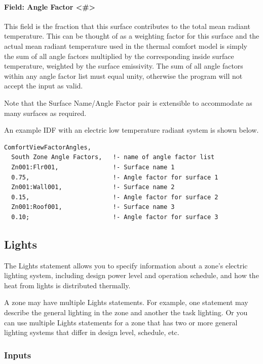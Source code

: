 \paragraph{Field: Angle Factor \textless{}\#\textgreater{}}\label{field-angle-factor}

This field is the fraction that this surface contributes to the total mean radiant temperature. This can be thought of as a weighting factor for this surface and the actual mean radiant temperature used in the thermal comfort model is simply the sum of all angle factors multiplied by the corresponding inside surface temperature, weighted by the surface emissivity. The sum of all angle factors within any angle factor list must equal unity, otherwise the program will not accept the input as valid.

Note that the Surface Name/Angle Factor pair is extensible to accommodate as many surfaces as required.

An example IDF with an electric low temperature radiant system is shown below.

\begin{lstlisting}
ComfortViewFactorAngles,
  South Zone Angle Factors,   !- name of angle factor list
  Zn001:Flr001,               !- Surface name 1
  0.75,                       !- Angle factor for surface 1
  Zn001:Wall001,              !- Surface name 2
  0.15,                       !- Angle factor for surface 2
  Zn001:Roof001,              !- Surface name 3
  0.10;                       !- Angle factor for surface 3
\end{lstlisting}

\subsection{Lights}\label{lights-000}

The Lights statement allows you to specify information about a zone's electric lighting system, including design power level and operation schedule, and how the heat from lights is distributed thermally.

A zone may have multiple Lights statements. For example, one statement may describe the general lighting in the zone and another the task lighting. Or you can use multiple Lights statements for a zone that has two or more general lighting systems that differ in design level, schedule, etc.

\subsubsection{Inputs}\label{inputs-2-021}

